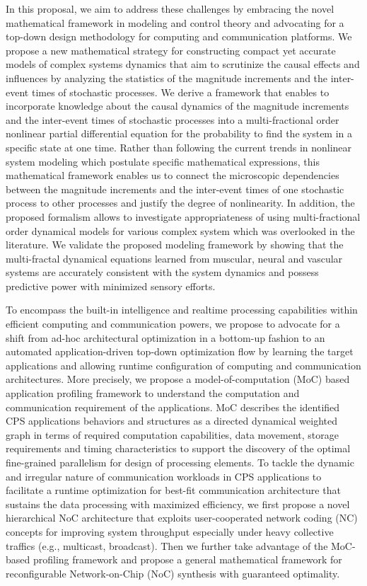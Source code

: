 \indent In this proposal, we aim to address these challenges by embracing the novel mathematical framework in modeling and control theory and advocating for a top-down design methodology for computing and communication platforms. We propose a new mathematical strategy for constructing compact yet accurate models of complex systems dynamics that aim to scrutinize the causal effects and influences by analyzing the statistics of the magnitude increments and the inter-event times of stochastic processes. We derive a framework that enables to incorporate knowledge about the causal dynamics of the magnitude increments and the inter-event times of stochastic processes into a multi-fractional order nonlinear partial differential equation for the probability to find the system in a specific state at one time. Rather than following the current trends in nonlinear system modeling which postulate specific mathematical expressions, this mathematical framework enables us to connect the microscopic dependencies between the magnitude increments and the inter-event times of one stochastic process to other processes and justify the degree of nonlinearity. In addition, the proposed formalism allows to investigate appropriateness of using multi-fractional order dynamical models for various complex system which was overlooked in the literature. We validate the proposed modeling framework by showing that the multi-fractal dynamical equations learned from muscular, neural and vascular systems are accurately consistent with the system dynamics and possess predictive power with minimized sensory efforts.

To encompass the built-in intelligence and realtime processing capabilities within efficient computing and communication powers, we propose to advocate for a shift from ad-hoc architectural optimization in a bottom-up fashion to an automated application-driven top-down optimization flow by learning the target applications and allowing runtime configuration of computing and communication architectures. More precisely, we propose a model-of-computation (MoC) based application profiling framework to understand the computation and communication requirement of the applications. MoC describes the identified CPS applications behaviors and structures as a directed dynamical weighted graph in terms of required computation capabilities, data movement, storage requirements and timing characteristics to support the discovery of the optimal fine-grained parallelism for design of processing elements. To tackle the dynamic and irregular nature of communication workloads in CPS applications to facilitate a runtime optimization for best-fit communication architecture that sustains the data processing with maximized efficiency, we first propose a novel hierarchical NoC architecture that exploits user-cooperated network coding (NC) concepts for improving system throughput especially under heavy collective traffics (e.g., multicast, broadcast). Then we further take advantage of the MoC-based profiling framework and propose a general mathematical framework for reconfigurable Network-on-Chip (NoC) synthesis with guaranteed optimality.

